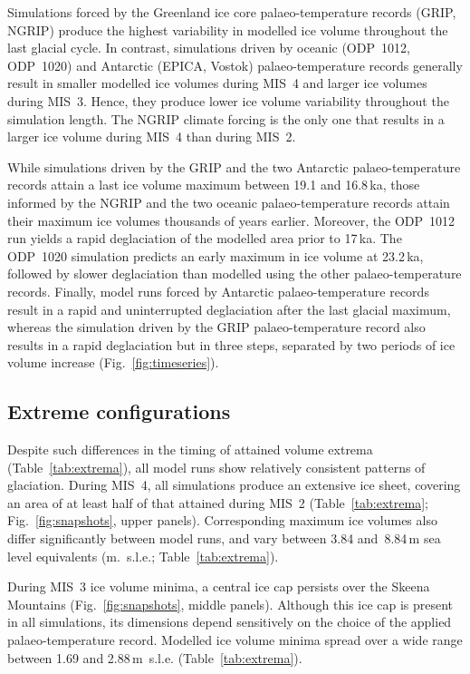 \documentclass[tc]{copernicus}
\begin{document}
Simulations forced by the Greenland ice core palaeo-temperature
records (GRIP, NGRIP) produce the highest variability in modelled ice volume
throughout the last glacial cycle. In contrast, simulations driven by oceanic
(ODP~1012, ODP~1020) and Antarctic (EPICA, Vostok) palaeo-temperature records
generally result in smaller
modelled ice volumes during MIS~4 and larger ice volumes during MIS~3.
Hence, they produce lower ice volume variability
throughout the simulation length. The NGRIP climate forcing is the only one
that results in a larger ice volume during MIS~4 than during MIS~2.

While simulations driven by the GRIP and the two Antarctic palaeo-temperature
records attain a last ice volume maximum between 19.1 and 16.8\,ka, those
informed by the NGRIP and the two oceanic palaeo-temperature records attain their
maximum ice volumes thousands of years earlier. Moreover, the ODP~1012 run
yields a rapid deglaciation of the modelled area prior to 17\,ka. The ODP~1020
simulation predicts an early maximum in ice volume at 23.2\,ka, followed by
slower deglaciation than modelled using the other palaeo-temperature records.
Finally, model runs forced by Antarctic palaeo-temperature records result in a
rapid and uninterrupted deglaciation after the last glacial maximum, whereas the
simulation driven by the GRIP palaeo-temperature record also results in a rapid
deglaciation but in three steps, separated by two periods of ice volume increase
(Fig.~\ref{fig:timeseries}).

\subsection{Extreme configurations}

Despite such differences in the timing of attained volume extrema
(Table~\ref{tab:extrema}), all model runs show relatively consistent
patterns of glaciation. During MIS~4, all simulations produce an extensive ice
sheet, covering an area of at least half of that attained during MIS~2
(Table~\ref{tab:extrema}; Fig.~\ref{fig:snapshots}, upper panels).
Corresponding maximum ice volumes also differ significantly between model runs,
and vary between 3.84 and~8.84\,m sea level equivalents (m.~s.l.e.;
Table~\ref{tab:extrema}).

During MIS~3 ice volume minima, a central ice cap persists over the Skeena
Mountains (Fig.~\ref{fig:snapshots}, middle panels). Although this ice cap is
present in all simulations, its dimensions depend sensitively on the choice of
the applied palaeo-temperature record. Modelled ice volume minima spread over a
wide range between 1.69 and 2.88\,m~s.l.e. (Table~\ref{tab:extrema}).
\end{document}
